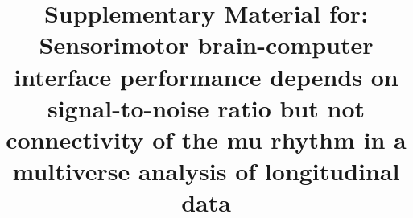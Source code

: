 \documentclass[preprint,authoryear,semicolon,12pt]{elsarticle}
\numberwithin{equation}{section}
\begin{document}
\begin{frontmatter}


\title{Supplementary Material for: Sensorimotor brain-computer interface performance depends on signal-to-noise ratio but not connectivity of the mu rhythm in a multiverse analysis of longitudinal data}



\end{frontmatter}


\newpage



\newpage

 

\end{document}
